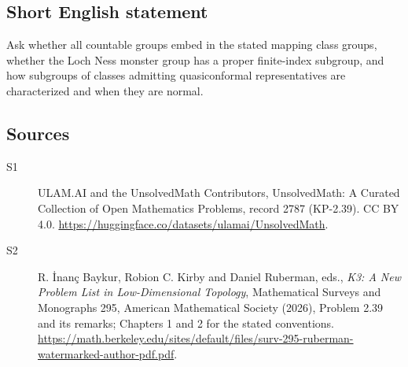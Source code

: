 \documentclass[11pt]{article}
\begin{document}
\subsection{Short English statement}
Ask whether all countable groups embed in the stated mapping class groups, whether the Loch Ness monster group has a proper finite-index subgroup, and how subgroups of classes admitting quasiconformal representatives are characterized and when they are normal.
\subsection{Sources}
\begin{description}
\item[\hypertarget{source:2787:1}{S1}] ULAM.AI and the UnsolvedMath Contributors, UnsolvedMath: A Curated Collection of Open Mathematics Problems, record 2787 (KP-2.39). CC BY 4.0. \url{https://huggingface.co/datasets/ulamai/UnsolvedMath}.
\item[\hypertarget{source:2787:2}{S2}] R. İnanç Baykur, Robion C. Kirby and Daniel Ruberman, eds., \emph{K3: A New Problem List in Low-Dimensional Topology}, Mathematical Surveys and Monographs 295, American Mathematical Society (2026), Problem 2.39 and its remarks; Chapters 1 and 2 for the stated conventions. \url{https://math.berkeley.edu/sites/default/files/surv-295-ruberman-watermarked-author-pdf.pdf}.
\end{description}
\label{end:2787}
\end{document}
